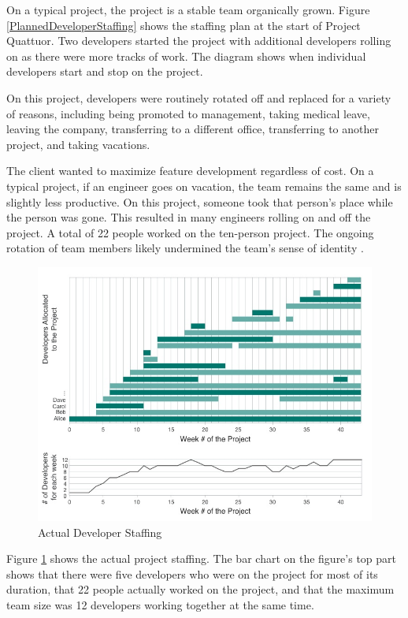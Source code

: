 On a typical project, the project is a stable team organically grown. Figure \ref{PlannedDeveloperStaffing} shows the staffing plan at the start of Project Quattuor. Two developers started the project with additional developers rolling on as there were more tracks of work. The diagram shows when individual developers start and stop on the project. 

On this project, developers were routinely rotated off and replaced for a variety of reasons, including being promoted to management, taking medical leave, leaving the company, transferring to a different office, transferring to another project, and taking vacations. 

The client wanted to maximize feature development regardless of cost. On a typical project, if an engineer goes on vacation, the team remains the same and is slightly less productive. On this project, someone took that person's place while the person was gone. This resulted in many engineers rolling on and off the project. A total of 22 people worked on the ten-person project. The ongoing rotation of team members likely undermined the team's sense of identity \cite{TuckmanModel}.

\begin{figure}[t]
\centering
\includegraphics[width=7.1in]{DeveloperStaffing.jpg}
\caption{Actual Developer Staffing}
\label{DeveloperStaffing}
\end{figure}

Figure \ref{DeveloperStaffing} shows the actual project staffing.  The bar chart on the figure's top part shows that there were five developers who were on the project for most of its duration, that 22 people actually worked on the project, and that the maximum team size was 12 developers working together at the same time.

